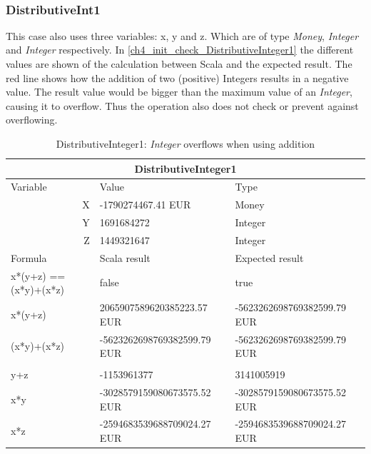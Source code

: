 \\

\subsubsection{DistributiveInt1}
This case also uses three variables: x, y and z. Which are of type \textit{Money}, \textit{Integer} and \textit{Integer} respectively. In \autoref{ch4_init_check_DistributiveInteger1} the different values are shown of the calculation between Scala and the expected result. The red line shows how the addition of two (positive) Integers results in a negative value. The result value would be bigger than the maximum value of an \textit{Integer}, causing it to overflow. Thus the operation also does not check or prevent against overflowing. 
\\
\begin{table}[h!]
\centering
\begin{tabular}{|lll|}
\hline
\multicolumn{3}{|c|}{DistributiveInteger1}                                             \\ \hline
Variable               & Value                       & Type                        \\
\multicolumn{1}{|r}{X} & -1790274467.41 EUR          & Money                       \\
\multicolumn{1}{|r}{Y} & 1691684272                  & Integer                     \\
\multicolumn{1}{|r}{Z} & 1449321647                  & Integer                     \\ \hline
Formula                & Scala result                & Expected result             \\
x*(y+z) == (x*y)+(x*z) & false                       & true                        \\
x*(y+z)                & 2065907589620385223.57 EUR  & -5623262698769382599.79 EUR \\
(x*y)+(x*z)            & -5623262698769382599.79 EUR & -5623262698769382599.79 EUR \\
                       &                             &                             \\
y+z                    & -1153961377                 & 3141005919                  \\
x*y                    & -3028579159080673575.52 EUR & -3028579159080673575.52 EUR \\
x*z                    & -2594683539688709024.27 EUR & -2594683539688709024.27 EUR \\ \hline
\end{tabular}
\caption{DistributiveInteger1: \textit{Integer} overflows when using addition}
\label{ch4_init_check_DistributiveInt1}
\end{table}
\\

